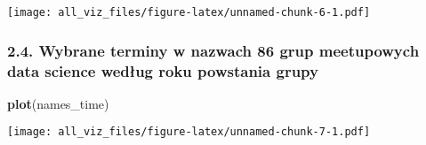 \documentclass[]{article}
\newenvironment{Shaded}{\begin{snugshade}}{\end{snugshade}}
\newcommand{\KeywordTok}[1]{\textcolor[rgb]{0.13,0.29,0.53}{\textbf{#1}}}
\newcommand{\NormalTok}[1]{#1}
\begin{document}
\texttt{[image: all\_viz\_files/figure-latex/unnamed-chunk-6-1.pdf]}

\hypertarget{wybrane-terminy-w-nazwach-86-grup-meetupowych-data-science-wedug-roku-powstania-grupy}{%
\subsubsection{2.4. Wybrane terminy w nazwach 86 grup meetupowych data
science według roku powstania
grupy}\label{wybrane-terminy-w-nazwach-86-grup-meetupowych-data-science-wedug-roku-powstania-grupy}}

\begin{Shaded}
\begin{Highlighting}[]
\KeywordTok{plot}\NormalTok{(names_time)}
\end{Highlighting}
\end{Shaded}

\texttt{[image: all\_viz\_files/figure-latex/unnamed-chunk-7-1.pdf]}
\end{document}
